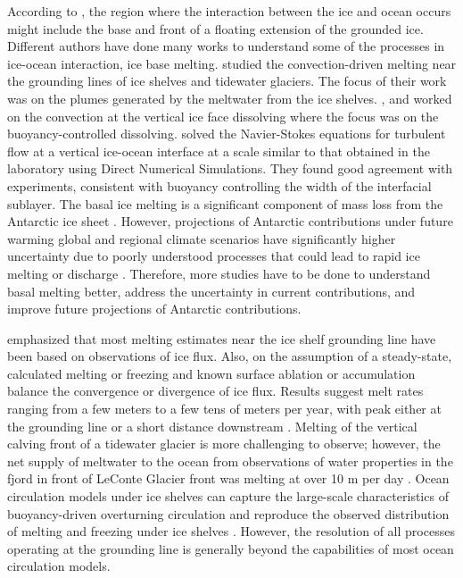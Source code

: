 \documentclass[11pt,a4paper]{article}
\begin{document}
	According to \citep{jenkins2011convection}, the region where the interaction between the ice and ocean occurs might include the base and front of a floating extension of the grounded ice. Different authors have done many works to understand some of the processes in ice-ocean interaction, ice base melting. \cite{jenkins2011convection} studied the convection-driven melting near the grounding lines of ice shelves and tidewater glaciers. The focus of their work was on the plumes generated by the meltwater from the ice shelves. \cite{kerr2015dissolution}, and \cite{gayen2016simulation} worked on the convection at the vertical ice face dissolving where the focus was on the buoyancy-controlled dissolving. \cite{gayen2016simulation} solved the Navier-Stokes equations for turbulent flow at a vertical ice-ocean interface at a scale similar to that obtained in the laboratory using Direct Numerical Simulations. They found good agreement with \cite{kerr2015dissolution} experiments, consistent with buoyancy controlling the width of the interfacial sublayer. The basal ice melting is a significant component of mass loss from the Antarctic ice sheet \citep{pritchard484mr, malyarenko2020synthesis}. However, projections of Antarctic contributions under future warming global and regional climate scenarios have significantly higher uncertainty due to poorly understood processes that could lead to rapid ice melting or discharge \citep{weertman1974stability,deconto2016contribution,gwyther2020vertical}. Therefore, more studies have to be done to understand basal melting better, address the uncertainty in current contributions, and improve future projections of Antarctic contributions.
	
	\cite{jenkins2011convection} emphasized that most melting estimates near the ice shelf grounding line have been based on observations of ice flux. Also, on the assumption of a steady-state, calculated melting or freezing and known surface ablation or accumulation balance the convergence or divergence of ice flux. Results suggest melt rates ranging from a few meters to a few tens of meters per year, with peak either at the grounding line or a short distance downstream \citep{jenkins1991ice,rignot2002rapid,jenkins2011convection}. Melting of the vertical calving front of a tidewater glacier is more challenging to observe; however, the net supply of meltwater to the ocean from observations of water properties in the fjord in front of LeConte Glacier front was melting at over 10 m per day \citep{motyka2003submarine}. Ocean circulation models under ice shelves can capture the large-scale characteristics of buoyancy-driven overturning circulation and reproduce the observed distribution of melting and freezing under ice shelves \citep{jenkins2002model, jenkins2011convection}. However, the resolution of all processes operating at the grounding line is generally beyond the capabilities of most ocean circulation models. 
	
\end{document}
